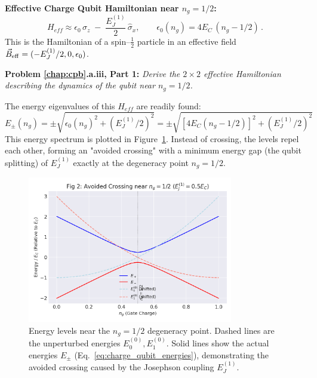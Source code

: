 \documentclass{book}
\newenvironment{keyresult}[1][Key Result]{\begin{framed}\noindent\textbf{#1:}}{\end{framed}}
\newenvironment{problem}[1][Problem]{\par\medskip\noindent\textbf{#1:}\em}{\par\medskip}
\begin{document}
\begin{keyresult}[Effective Charge Qubit Hamiltonian near $n_g = 1/2$]
\label{res:charge_qubit_ham}
\[
H_{eff} \approx \epsilon_0 \,\hat{\sigma}_z
              \;-\;\frac{E_J^{(1)}}{2}\,\hat{\sigma}_x,
\qquad
\epsilon_0(n_g) = 4E_C\,(n_g - 1/2)\,. 
\]
This is the Hamiltonian of a spin–\(\tfrac12\) particle in an effective field 
\(\vec B_{\rm eff}=(-E_J^{(1)}/2,0,\epsilon_0)\).

\end{keyresult}

\begin{problem}[Problem \ref{chap:cpb}.a.iii, Part 1]
Derive the \(2 \times 2\) effective Hamiltonian describing the dynamics of the qubit near \(n_g=1/2\).
\end{problem}

The energy eigenvalues of this \(H_{eff}\) are readily found:
\begin{equation}
E_{\pm}(n_g) = \pm \sqrt{\epsilon_0(n_g)^2 + (E_J^{(1)}/2)^2} = \pm \sqrt{[4 E_C (n_g - 1/2)]^2 + (E_J^{(1)}/2)^2}
\label{eq:charge_qubit_energies}
\end{equation}
This energy spectrum is plotted in Figure~\ref{fig:avoided_crossing}. Instead of crossing, the levels repel each other, forming an "avoided crossing" with a minimum energy gap (the qubit splitting) of \(E_J^{(1)}\) exactly at the degeneracy point \(n_g=1/2\).

\begin{figure}[h]
    \centering
    \includegraphics[width=0.8\textwidth]{fig_avoid_crossing.png}
    \caption[Avoided crossing near n\_g=1/2]{Energy levels near the \(n_g = 1/2\) degeneracy point. Dashed lines are the unperturbed energies \(E_0^{(0)}, E_1^{(0)}\). Solid lines show the actual energies \(E_{\pm}\) (Eq.~\ref{eq:charge_qubit_energies}), demonstrating the avoided crossing caused by the Josephson coupling \(E_J^{(1)}\).}
    \label{fig:avoided_crossing}
\end{figure}
\end{document}
